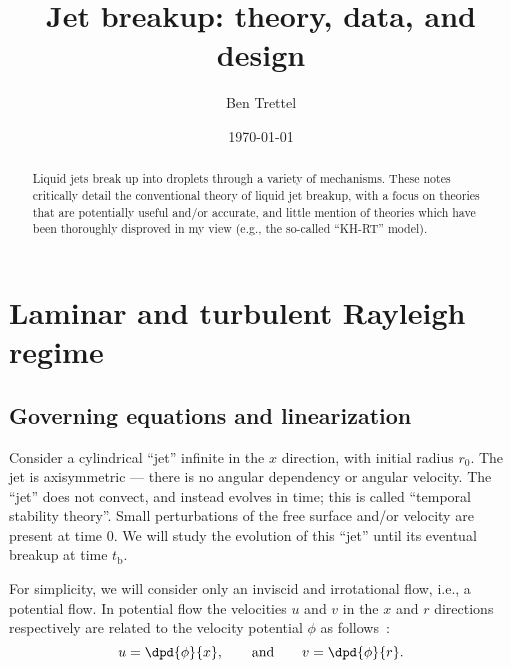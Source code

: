 \documentclass[ccbysa,note,git]{bmtreport}
\title{Jet breakup: theory, data, and design}
\author{Ben Trettel}
\date{\today}
\begin{document}
\maketitle
\begin{abstract}
Liquid jets break up into droplets through a variety of mechanisms. These notes critically detail the conventional theory of liquid jet breakup, with a focus on theories that are potentially useful and/or accurate, and little mention of theories which have been thoroughly disproved in my view (e.g., the so-called ``KH-RT'' model).
\end{abstract}

\section{Laminar and turbulent Rayleigh regime}


\subsection{Governing equations and linearization}

Consider a cylindrical ``jet'' infinite in the $x$ direction, with initial radius $r_0$. The jet is axisymmetric --- there is no angular dependency or angular velocity. The ``jet'' does not convect, and instead evolves in time; this is called ``temporal stability theory''. Small perturbations of the free surface and/or velocity are present at time $0$. We will study the evolution of this ``jet'' until its eventual breakup at time $t_\text{b}$.

For simplicity, we will consider only an inviscid and irrotational flow, i.e., a potential flow. In potential flow the velocities $u$ and $v$ in the $x$ and $r$ directions respectively are related to the velocity potential $\phi$ as follows~\citep[p.~283]{panton_incompressible_2013}:
\begin{equation}
   u = \dpd{\phi}{x}, \qquad \text{and} \qquad v = \dpd{\phi}{r}.
\end{equation}
\end{document}
